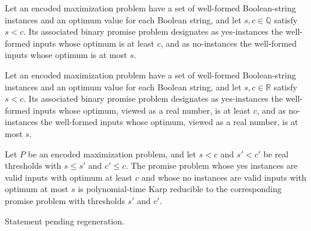 \begin{definition}
\label{FABL.EncodedMaximizationProblem.gapPromise}
\leanok
{}
Let an encoded maximization problem have a set of well-formed Boolean-string instances
and an optimum value for each Boolean string, and let $s,c\in\mathbb{Q}$ satisfy $s<c$.
Its associated binary promise problem designates as yes-instances the well-formed inputs
whose optimum is at least $c$, and as no-instances the well-formed inputs whose optimum
is at most $s$.
\end{definition}

\begin{definition}
\label{FABL.EncodedMaximizationProblem.gapPromiseReal}
\leanok
{}
Let an encoded maximization problem have a set of well-formed Boolean-string instances
and an optimum value for each Boolean string, and let $s,c\in\mathbb{R}$ satisfy $s<c$.
Its associated binary promise problem designates as yes-instances the well-formed inputs
whose optimum, viewed as a real number, is at least $c$, and as no-instances the
well-formed inputs whose optimum, viewed as a real number, is at most $s$.
\end{definition}

\begin{theorem}
\label{FABL.EncodedMaximizationProblem.gapPromiseReal_reducible_of_thresholds}
\leanok
{}
Let $P$ be an encoded maximization problem, and let $s<c$ and $s'<c'$ be real thresholds
with $s\le s'$ and $c'\le c$. The promise problem whose yes instances are valid inputs
with optimum at least $c$ and whose no instances are valid inputs with optimum at most
$s$ is polynomial-time Karp reducible to the corresponding promise problem with
thresholds $s'$ and $c'$.
\end{theorem}

\begin{theorem}
\label{FABL.PolytimeMap.IsThresholdApproximation.distinguishesGap}
\leanok
{}
Statement pending regeneration.
\end{theorem}
